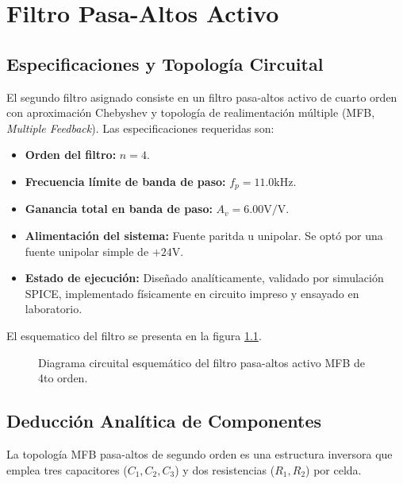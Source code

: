 \chapter{Filtro Pasa-Altos Activo}

\section{Especificaciones y Topología Circuital}
El segundo filtro asignado consiste en un filtro pasa-altos activo de cuarto orden con aproximación Chebyshev y
topología de realimentación múltiple (MFB, \textit{Multiple Feedback}). Las especificaciones requeridas son:

\begin{itemize}
    \item \textbf{Orden del filtro:} $n = 4$.
    \item \textbf{Frecuencia límite de banda de paso:} $f_p = 11.0 \unit{\kilo\hertz}$.
    \item \textbf{Ganancia total en banda de paso:} $A_v = 6.00 \unit{\volt\per\volt}$.
    \item \textbf{Alimentación del sistema:} Fuente paritda u unipolar. Se optó por una fuente unipolar simple de $+24
        \unit{\volt}$.
    \item \textbf{Estado de ejecución:} Diseñado analíticamente, validado por simulación SPICE, implementado físicamente
        en circuito impreso y ensayado en laboratorio.
\end{itemize}
El esquematico del filtro se presenta en la figura \ref{fig.ej3:sch}.
\begin{figure}[!ht]
    \centering
    
    \caption{Diagrama circuital esquemático del filtro pasa-altos activo MFB de 4to orden.}
    \label{fig.ej3:sch}
\end{figure}

\section{Deducción Analítica de Componentes}
La topología MFB pasa-altos de segundo orden es una estructura inversora que emplea tres capacitores ($C_1, C_2, C_3$) y
dos resistencias ($R_1, R_2$) por celda.

